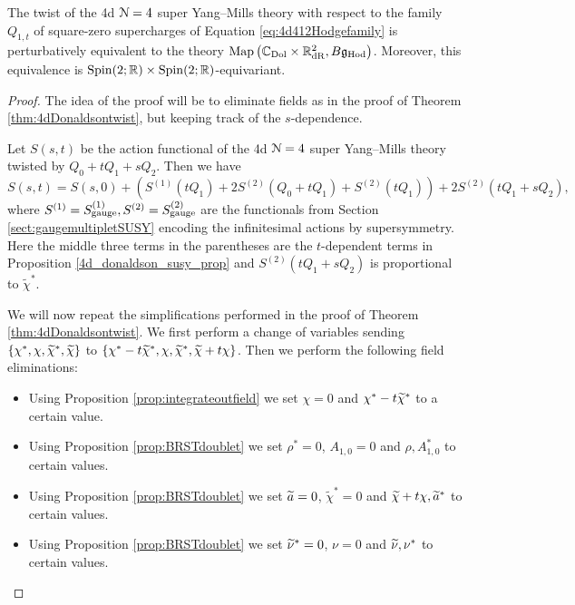 \documentclass[10pt, oneside]{article}
\begin{document}
\begin{theorem}
The twist of the 4d $\cN=4$ super Yang--Mills theory with respect to the family $Q_{1, t}$ of square-zero supercharges of Equation \eqref{eq:4d412Hodgefamily} is perturbatively equivalent to the theory $\map\left(\CC_{\rm Dol} \times \RR^2_{\mr{dR}}, B\fg_{\Hod}\right)$. Moreover, this equivalence is $\spin(2;\RR) \times \spin(2;\RR)$-equivariant.
\end{theorem}
\begin{proof}
The idea of the proof will be to eliminate fields as in the proof of Theorem \ref{thm:4dDonaldsontwist}, but keeping track of the $s$-dependence.

Let $S(s,t)$ be the action functional of the 4d $\cN=4$ super Yang--Mills theory twisted by $Q_0 + tQ_1 + sQ_2$. Then we have
\begin{equation}\label{eqn:(2,1)2}
S(s, t) = S(s, 0) + \left(S^{(1)}(tQ_1) + 2 S^{(2)}(Q_0 + tQ_1) + S^{(2)}(tQ_1)\right) + 2S^{(2)}(tQ_1 + sQ_2),
\end{equation}
where $S^{(1)} = S^{(1)}_{\rm gauge}, S^{(2)} = S^{(2)}_{\rm gauge}$ are the functionals from Section \ref{sect:gaugemultipletSUSY} encoding the infinitesimal actions by supersymmetry. Here the middle three terms in the parentheses are the $t$-dependent terms in Proposition \ref{4d_donaldson_susy_prop} and $S^{(2)}(tQ_1 + sQ_2)$ is proportional to $\tilde{\chi}^*$.

We will now repeat the simplifications performed in the proof of Theorem \ref{thm:4dDonaldsontwist}. We first perform a change of variables sending $\{\chi^*, \chi, \wt\chi^*, \wt\chi\}$ to $\{\chi^*-t\wt\chi^*, \chi, \wt\chi^*, \wt\chi + t\chi\}$. Then we perform the following field eliminations:
\begin{itemize}
\item Using Proposition \ref{prop:integrateoutfield} we set $\chi = 0$ and $\chi^* - t\wt\chi^*$ to a certain value.

\item Using Proposition \ref{prop:BRSTdoublet} we set $\rho^* = 0$, $A_{1, 0} = 0$ and $\rho, A_{1, 0}^*$ to certain values.

\item Using Proposition \ref{prop:BRSTdoublet} we set $\Tilde{a} = 0$, $\tilde{\chi}^*=0$ and $\Tilde{\chi}+t\chi, \Tilde{a}^*$ to certain values.

\item Using Proposition \ref{prop:BRSTdoublet} we set $\Tilde{\nu}^* = 0$, $\nu = 0$ and $\Tilde{\nu},\nu^*$ to certain values.
\end{itemize}


\end{proof}
\end{document}
